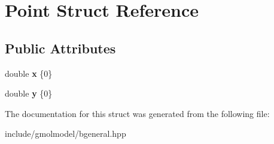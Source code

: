 \hypertarget{structPoint}{}\section{Point Struct Reference}
\label{structPoint}
\subsection*{Public Attributes}
\begin{DoxyCompactItemize}
\item 
double {\bfseries x} \{0\}\hypertarget{structPoint_ab99c56589bc8ad5fa5071387110a5bc7}{}\label{structPoint_ab99c56589bc8ad5fa5071387110a5bc7}

\item 
double {\bfseries y} \{0\}\hypertarget{structPoint_afa38be143ae800e6ad69ce8ed4df62d8}{}\label{structPoint_afa38be143ae800e6ad69ce8ed4df62d8}

\end{DoxyCompactItemize}


The documentation for this struct was generated from the following file\+:\begin{DoxyCompactItemize}
\item 
include/gmolmodel/bgeneral.\+hpp\end{DoxyCompactItemize}

